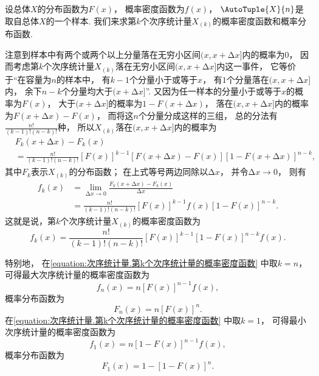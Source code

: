 设总体\(X\)的分布函数为\(F(x)\)，
概率密度函数为\(f(x)\)，
\(\AutoTuple{X}{n}\)是取自总体\(X\)的一个样本.
我们来求第\(k\)个次序统计量\(X_{(k)}\)的概率密度函数和概率分布函数.

注意到样本中有两个或两个以上分量落在无穷小区间\((x,x+\increment x]\)内的概率为\(0\)，
因而考虑第\(k\)个次序统计量\(X_{(k)}\)落在无穷小区间\((x,x+\increment x]\)内这一事件，
它等价于“在容量为\(n\)的样本中，
有\(k-1\)个分量小于或等于\(x\)，
有\(1\)个分量落在\((x,x+\increment x]\)内，
余下\(n-k\)个分量均大于\((x+\increment x]\)”.
又因为任一样本的分量小于或等于\(x\)的概率为\(F(x)\)，
大于\((x+\increment x]\)的概率为\(1 - F(x+\increment x)\)，
落在\((x,x+\increment x]\)内的概率为\(F(x+\increment x) - F(x)\)，
而将这\(n\)个分量分成这样的三组，
总的分法有\(\frac{n!}{(k-1)! (n-k)!}\)种，
所以\(X_{(k)}\)落在\((x,x+\increment x]\)内的概率为
\begin{align*}
	&F_k(x+\increment x) - F_k(x) \\
	&= \frac{n!}{(k-1)! (n-k)!} [F(x)]^{k-1} [F(x+\increment x) - F(x)] [1-F(x+\increment x)]^{n-k},
\end{align*}
其中\(F_k\)表示\(X_{(k)}\)的分布函数；
在上式等号两边同除以\(\increment x\)，
并令\(\increment x\to0\)，
则有\begin{align*}
	f_k(x)
	&= \lim_{\increment x\to0} \frac{F_k(x+\increment x) - F_k(x)}{\increment x} \\
	&= \frac{n!}{(k-1)! (n-k)!} [F(x)]^{k-1} f(x) [1-F(x)]^{n-k}.
\end{align*}
这就是说，第\(k\)个次序统计量\(X_{(k)}\)的概率密度函数为
\begin{equation}\label{equation:次序统计量.第k个次序统计量的概率密度函数}
	f_k(x)
	= \frac{n!}{(k-1)! (n-k)!} [F(x)]^{k-1} [1-F(x)]^{n-k} f(x).
\end{equation}

特别地，
在\cref{equation:次序统计量.第k个次序统计量的概率密度函数} 中取\(k=n\)，
可得最大次序统计量的概率密度函数为
\begin{equation}
	f_n(x)
	= n [F(x)]^{n-1} f(x),
\end{equation}
概率分布函数为
\begin{equation}
	F_n(x)
	= n [F(x)]^n.
\end{equation}
在\cref{equation:次序统计量.第k个次序统计量的概率密度函数} 中取\(k=1\)，
可得最小次序统计量的概率密度函数为
\begin{equation}
	f_1(x)
	= n [1-F(x)]^{n-1} f(x),
\end{equation}
概率分布函数为
\begin{equation}
	F_1(x)
	= 1 - [1 - F(x)]^n.
\end{equation}

